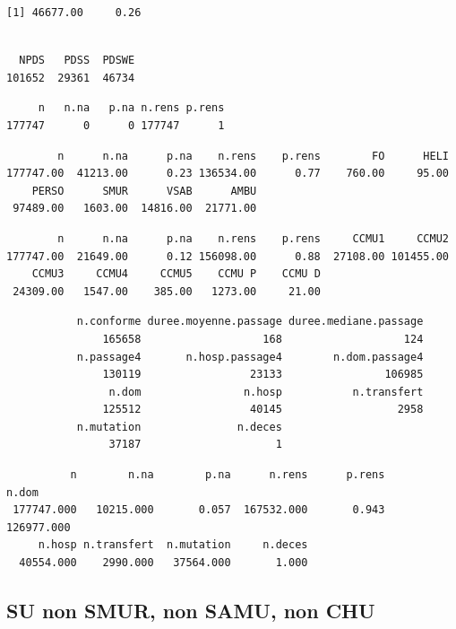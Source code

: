 \documentclass[]{article}
\begin{document}
\begin{verbatim}
[1] 46677.00     0.26
\end{verbatim}

\begin{verbatim}

  NPDS   PDSS  PDSWE 
101652  29361  46734 
\end{verbatim}

\begin{verbatim}
     n   n.na   p.na n.rens p.rens 
177747      0      0 177747      1 
\end{verbatim}

\begin{verbatim}
        n      n.na      p.na    n.rens    p.rens        FO      HELI 
177747.00  41213.00      0.23 136534.00      0.77    760.00     95.00 
    PERSO      SMUR      VSAB      AMBU 
 97489.00   1603.00  14816.00  21771.00 
\end{verbatim}

\begin{verbatim}
        n      n.na      p.na    n.rens    p.rens     CCMU1     CCMU2 
177747.00  21649.00      0.12 156098.00      0.88  27108.00 101455.00 
    CCMU3     CCMU4     CCMU5    CCMU P    CCMU D 
 24309.00   1547.00    385.00   1273.00     21.00 
\end{verbatim}

\begin{verbatim}
           n.conforme duree.moyenne.passage duree.mediane.passage 
               165658                   168                   124 
           n.passage4       n.hosp.passage4        n.dom.passage4 
               130119                 23133                106985 
                n.dom                n.hosp           n.transfert 
               125512                 40145                  2958 
           n.mutation               n.deces 
                37187                     1 
\end{verbatim}

\begin{verbatim}
          n        n.na        p.na      n.rens      p.rens       n.dom 
 177747.000   10215.000       0.057  167532.000       0.943  126977.000 
     n.hosp n.transfert  n.mutation     n.deces 
  40554.000    2990.000   37564.000       1.000 
\end{verbatim}

\subsection{SU non SMUR, non SAMU, non
CHU}\label{su-non-smur-non-samu-non-chu}
\end{document}
